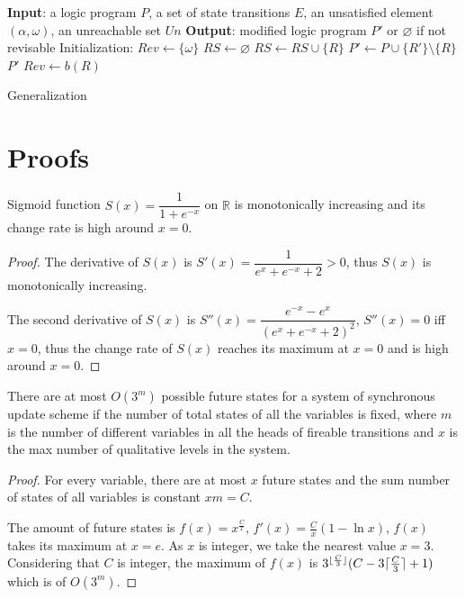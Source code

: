 \begin{algorithm}[ht]
\begin{algorithmic}
    \State \textbf{Input}: a logic program $P$, a set of state transitions $E$, an unsatisfied element $(\alpha,\omega)$, an unreachable set $Un$
    \State \textbf{Output}: modified logic program $P'$ or $\varnothing$ if not revisable
    \State Initialization: $Rev\gets\{\omega\}$
    \Do
    \State $RS\gets \varnothing$
            \State $RS\gets RS\cup \{R\}$
        \EndIf
    \EndFor
            \State $P'\gets P\cup \{R'\}\setminus \{R\}$
                    \State\Return $P'$
                \EndIf
            \EndIf
        \EndFor
    \EndFor
        \State $Rev\gets b(R)$
    \EndFor
\end{algorithmic}
\caption{Generalization}\label{alg:generalization}
\end{algorithm}

\chapter{Proofs}\label{sec:proof}
\begin{theorem}
    Sigmoid function $S(x)={\dfrac {1}{1+e^{-x}}}$ on $\mathbb{R}$ is monotonically increasing and its change rate is high around $x=0$.
    \begin{proof}
    The derivative of $S(x)$ is $S'(x)=\dfrac{1}{e^x+e^{-x}+2}>0$, thus $S(x)$ is monotonically increasing.
    
    The second derivative of $S(x)$ is $S''(x)=\dfrac{e^{-x}-e^x}{(e^x+e^{-x}+2)^2}$, $S''(x)=0$ iff $x=0$, thus the change rate of $S(x)$ reaches its maximum at $x=0$ and is high around $x=0$.
    \end{proof}
\end{theorem}

\begin{theorem}
    There are at most $O(3^m)$ possible future states for a system of synchronous update scheme if the number of total states of all the variables is fixed, where $m$ is the number of different variables in all the heads of fireable transitions and $x$ is the max number of qualitative levels in the system. 
    \begin{proof}
         For every variable, there are at most $x$ future states and the sum number of states of all variables is constant $xm=C$.
         
         The amount of future states is $f(x)=x^{\frac{C}{x}}$, $f'(x)=\frac{C}{x}(1-\ln x)$, $f(x)$ takes its maximum at $x=e$.
         As $x$ is integer, we take the nearest value $x=3$.
         Considering that $C$ is integer, the maximum of $f(x)$ is $3^{\lfloor\frac{C}{3}\rfloor}(C-3\lceil\frac{C}{3}\rceil+1)$ which is of $O(3^m)$.
    \end{proof}
\end{theorem}

